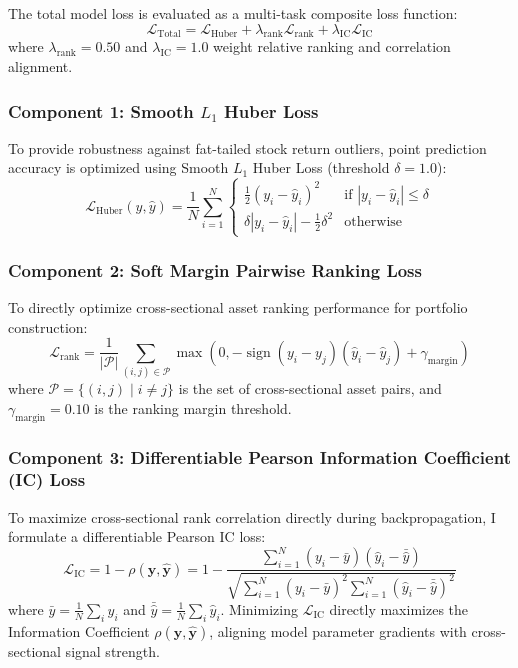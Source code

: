 The total model loss is evaluated as a multi-task composite loss function:
\begin{equation}
\mathcal{L}_{\text{Total}} = \mathcal{L}_{\operatorname{Huber}} + \lambda_{\text{rank}} \mathcal{L}_{\text{rank}} + \lambda_{\operatorname{IC}} \mathcal{L}_{\operatorname{IC}}
\label{eq:ch3_multitask_loss}
\end{equation}
where $\lambda_{\text{rank}} = 0.50$ and $\lambda_{\operatorname{IC}} = 1.0$ weight relative ranking and correlation alignment.

\subsubsection{Component 1: Smooth $L_1$ Huber Loss}
To provide robustness against fat-tailed stock return outliers, point prediction accuracy is optimized using Smooth $L_1$ Huber Loss (threshold $\delta = 1.0$):
\begin{equation}
\mathcal{L}_{\operatorname{Huber}}(y, \hat{y}) = \frac{1}{N} \sum_{i=1}^N \begin{cases} 
\frac{1}{2} (y_i - \hat{y}_i)^2 & \text{if } |y_i - \hat{y}_i| \le \delta \\
\delta |y_i - \hat{y}_i| - \frac{1}{2}\delta^2 & \text{otherwise}
\end{cases}
\label{eq:ch3_huber_loss}
\end{equation}

\subsubsection{Component 2: Soft Margin Pairwise Ranking Loss}
To directly optimize cross-sectional asset ranking performance for portfolio construction:
\begin{equation}
\mathcal{L}_{\text{rank}} = \frac{1}{|\mathcal{P}|} \sum_{(i,j) \in \mathcal{P}} \max\left( 0, -\operatorname{sign}(y_i - y_j)(\hat{y}_i - \hat{y}_j) + \gamma_{\text{margin}} \right)
\label{eq:ch3_ranking_loss}
\end{equation}
where $\mathcal{P} = \{(i,j) \mid i \neq j\}$ is the set of cross-sectional asset pairs, and $\gamma_{\text{margin}} = 0.10$ is the ranking margin threshold.

\subsubsection{Component 3: Differentiable Pearson Information Coefficient (IC) Loss}
To maximize cross-sectional rank correlation directly during backpropagation, I formulate a differentiable Pearson IC loss:
\begin{equation}
\mathcal{L}_{\operatorname{IC}} = 1 - \rho(\mathbf{y}, \hat{\mathbf{y}}) = 1 - \frac{\sum_{i=1}^N (y_i - \bar{y})(\hat{y}_i - \bar{\hat{y}})}{\sqrt{ \sum_{i=1}^N (y_i - \bar{y})^2 \sum_{i=1}^N (\hat{y}_i - \bar{\hat{y}})^2 }}
\label{eq:ch3_ic_loss}
\end{equation}
where $\bar{y} = \frac{1}{N}\sum_i y_i$ and $\bar{\hat{y}} = \frac{1}{N}\sum_i \hat{y}_i$. Minimizing $\mathcal{L}_{\operatorname{IC}}$ directly maximizes the Information Coefficient $\rho(\mathbf{y}, \hat{\mathbf{y}})$, aligning model parameter gradients with cross-sectional signal strength.

